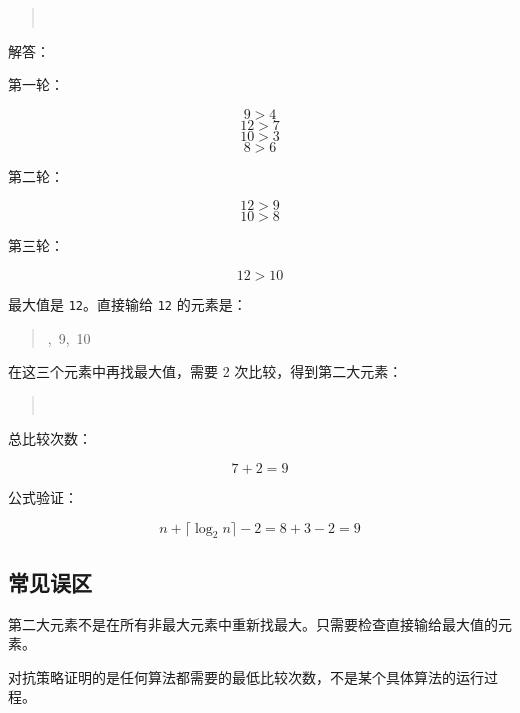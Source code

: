 \documentclass[UTF8,zihao=-4]{ctexart}
\begin{document}
\begin{quote}
\small\ttfamily\raggedright
\relax [9,\ 4,\ 7,\ 12,\ 3,\ 10,\ 6,\ 8]\\
\end{quote}

解答：

第一轮：

\[9 > 4\]
\[12 > 7\]
\[10 > 3\]
\[8 > 6\]

第二轮：

\[12 > 9\]
\[10 > 8\]

第三轮：

\[12 > 10\]

最大值是 \texttt{12}。直接输给 \texttt{12} 的元素是：

\begin{quote}
\small\ttfamily\raggedright
{},\ 9,\ 10\\
\end{quote}

在这三个元素中再找最大值，需要 2 次比较，得到第二大元素：

\begin{quote}
\small\ttfamily\raggedright
{}\\
\end{quote}

总比较次数：

\[7 + 2 = 9\]

公式验证：

\[n + \lceil \log_2 n \rceil - 2 = 8 + 3 - 2 = 9\]

\subsection*{常见误区}

第二大元素不是在所有非最大元素中重新找最大。只需要检查直接输给最大值的元素。

对抗策略证明的是任何算法都需要的最低比较次数，不是某个具体算法的运行过程。
\end{document}

